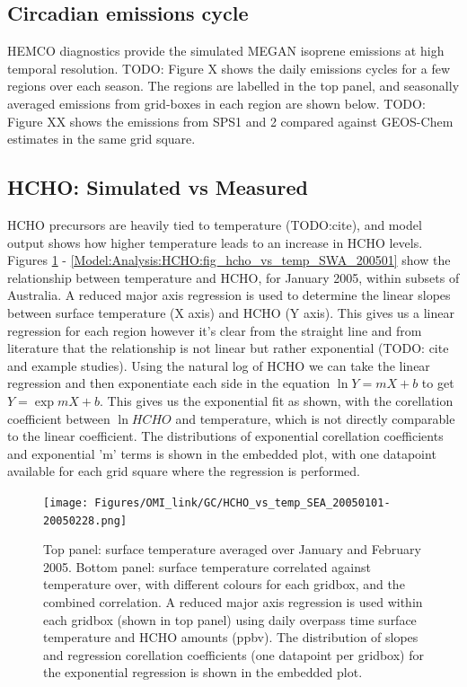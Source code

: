     
    
  \subsection{Circadian emissions cycle}
    HEMCO diagnostics provide the simulated MEGAN isoprene emissions at high temporal resolution.
    TODO: Figure X shows the daily emissions cycles for a few regions over each season. 
    The regions are labelled in the top panel, and seasonally averaged emissions from grid-boxes in each region are shown below.
    TODO: Figure XX shows the emissions from SPS1 and 2 compared against GEOS-Chem estimates in the same grid square.
    
  \subsection{HCHO: Simulated vs Measured}
  \label{Model:Analysis:HCHO}
    
    HCHO precursors are heavily tied to temperature (TODO:cite), and model output shows how higher temperature leads to an increase in HCHO levels.
    Figures \ref{Model:Analysis:HCHO:fig_hcho_vs_temp_SEA_200501} - \ref{Model:Analysis:HCHO:fig_hcho_vs_temp_SWA_200501} show the relationship between temperature and HCHO, for January 2005, within subsets of Australia.
    A reduced major axis regression is used to determine the linear slopes between surface temperature (X axis) and HCHO (Y axis).
    This gives us a linear regression for each region however it's clear from the straight line and from literature that the relationship is not linear but rather exponential (TODO: cite and example studies).
    Using the natural log of HCHO we can take the linear regression and then exponentiate each side in the equation $\ln{Y} = m{X}+b$ to get ${Y} = \exp{m{X}+b}$. 
    This gives us the exponential fit as shown, with the corellation coefficient between $\ln{HCHO}$ and temperature, which is not directly comparable to the linear coefficient.
    The distributions of exponential corellation coefficients and exponential 'm' terms is shown in the embedded plot, with one datapoint available for each grid square where the regression is performed.
    
    
    \begin{figure}
      \texttt{[image: Figures/OMI\_link/GC/HCHO\_vs\_temp\_SEA\_20050101-20050228.png]}
      \caption{%
        Top panel: surface temperature averaged over January and February 2005.
        Bottom panel: surface temperature correlated against temperature over, with different colours for each gridbox, and the combined correlation. 
        A reduced major axis regression is used within each gridbox (shown in top panel) using daily overpass time surface temperature and HCHO amounts (ppbv).
        The distribution of slopes and regression corellation coefficients (one datapoint per gridbox) for the exponential regression is shown in the embedded plot.
      }
      \label{Model:Analysis:HCHO:fig_hcho_vs_temp_SEA_200501}
    \end{figure}
    
